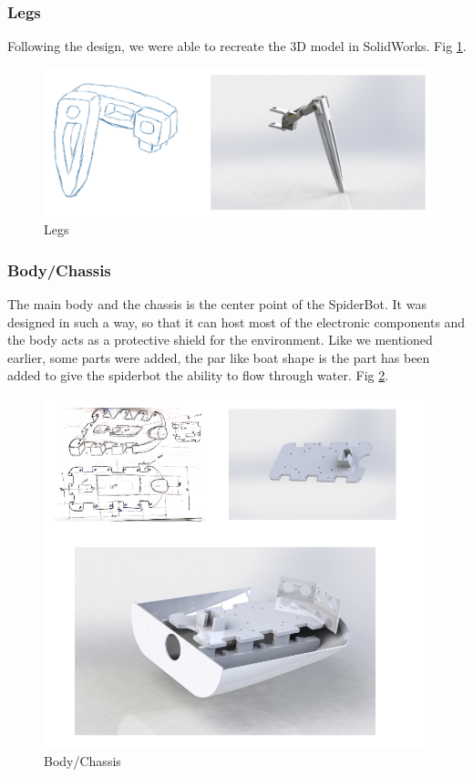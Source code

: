 \documentclass[10pt,journal,compsoc]{IEEEtran}
\begin{document}
\subsubsection{Legs}

Following the design, we were able to recreate the 3D model in SolidWorks. Fig \ref{fig:legs}.

\begin{figure}[h]
\includegraphics[scale=0.34]{legs}
\caption{Legs}
\label{fig:legs}
\end{figure}

\subsubsection{Body/Chassis}

The main body and the chassis is the center point of the SpiderBot. It was designed in such a way, so that it can host most of the electronic components and the body acts as a protective shield for the environment. Like we mentioned earlier, some parts were added, the par like boat shape is the part has been added to give the spiderbot the ability to flow through water. Fig \ref{fig:body}.

\begin{figure}[h]
\includegraphics[scale=0.48]{bodychasis}
\caption{Body/Chassis}
\label{fig:body}
\end{figure}
\end{document}
